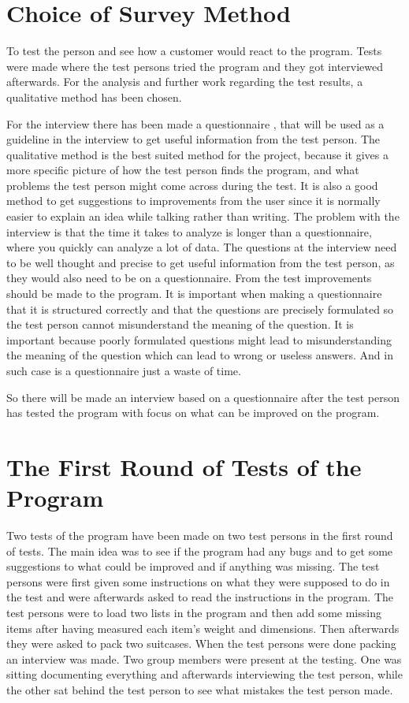 \section{Choice of Survey Method}
To test the person and see how a customer would react to the program. Tests were made where the test persons tried the program and they got interviewed afterwards. For the analysis and further work regarding the test results, a qualitative method has been chosen.

For the interview there has been made a questionnaire , that will be used as a guideline in the interview to get useful information from the test person. The qualitative method is the best suited method for the project, because it gives a more specific picture of how the test person finds the program, and what problems the test person might come across during the test. It is also a good method to get suggestions to improvements from the user since it is normally easier to explain an idea while talking rather than writing. The problem with the interview is that the time it takes to analyze is longer than a questionnaire, where you quickly can analyze a lot of data. The questions at the interview need to be well thought and precise to get useful information from the test person, as they would also need to be on a questionnaire. From the test improvements should be made to the program. 
It is important when making a questionnaire that it is structured correctly and that the questions are precisely formulated so the test person cannot misunderstand the meaning of the question. It is important because poorly formulated questions might lead to misunderstanding the meaning of the question which can lead to wrong or useless answers. And in such case is a questionnaire just a waste of time.

So there will be made an interview based on a questionnaire after the test person has tested the program with focus on what can be improved on the program.

\section{The First Round of Tests of the Program}
Two tests of the program have been made on two test persons in the first round of tests. The main idea was to see if the program had any bugs and to get some suggestions to what could be improved and if anything was missing. The test persons were first given some instructions on what they were supposed to do in the test and were afterwards asked to read the instructions in the program. The test persons were to load two lists in the program and then add some missing items after having measured each item's weight and dimensions. Then afterwards they were asked to pack two suitcases. When the test persons were done packing an interview was made. Two group members were present at the testing. One was sitting documenting everything and afterwards interviewing the test person, while the other sat behind the test person to see what mistakes the test person made.

